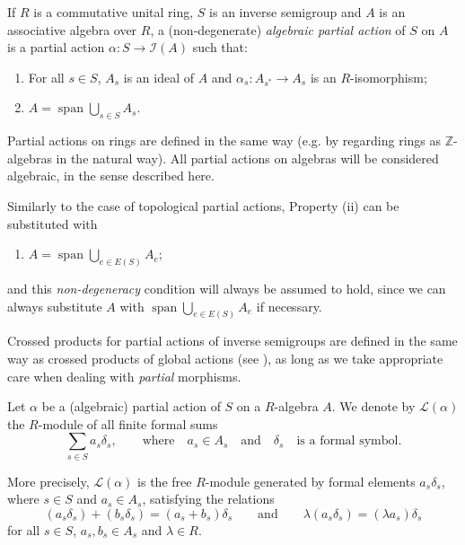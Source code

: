\begin{definition}[{\cite{MR2115083}}]\label{definitionalgebraicpartialaction}
If $R$ is a commutative unital ring, $S$ is an inverse semigroup and $A$ is an associative algebra over $R$, a (non-degenerate) \emph{algebraic partial action} of $S$ on $A$ is a partial action $\alpha:S\to\mathcal{I}(A)$ such that:
\begin{enumerate}
\item[(i)] For all $s\in S$, $A_s$ is an ideal of $A$ and $\alpha_s:A_{s^*}\to A_s$ is an $R$-isomorphism;
\item[(ii)] $A=\operatorname{span}\bigcup_{s\in S}A_s$.
\end{enumerate}
Partial actions on rings are defined in the same way (e.g. by regarding rings as $\mathbb{Z}$-algebras in the natural way). All partial actions on algebras will be considered algebraic, in the sense described here.
\end{definition}

Similarly to the case of topological partial actions, Property (ii) can be substituted with
\begin{enumerate}
\item[(ii)'] $A=\operatorname{span}\bigcup_{e\in E(S)}A_e$;
\end{enumerate}
and this \emph{non-degeneracy} condition will always be assumed to hold, since we can always substitute $A$ with $\operatorname{span}\bigcup_{e\in E(S)}A_e$ if necessary.

Crossed products for partial actions of inverse semigroups are defined in the same way as crossed products of global actions (see \cite{MR2559043}), as long as we take appropriate care when dealing with \emph{partial} morphisms.

\begin{definition}\label{definitionLalpha}
Let $\alpha$ be a (algebraic) partial action of $S$ on a $R$-algebra $A$. We denote by $\mathscr{L}(\alpha)$ the $R$-module of all finite formal sums
\[\sum_{s\in S} a_s \delta_s,\qquad\text{where}\quad a_s\in A_s\quad\text{and}\quad\delta_s\quad\text{is a formal symbol}.\]

More precisely, $\mathscr{L}(\alpha)$ is the free $R$-module generated by formal elements $a_s\delta_s$, where $s\in S$ and $a_s\in A_s$, satisfying the relations
\[(a_s\delta_s)+(b_s\delta_s)=(a_s+b_s)\delta_s\qquad\text{and}\qquad \lambda(a_s\delta_s)=(\lambda a_s)\delta_s\]
for all $s\in S$, $a_s,b_s\in A_s$ and $\lambda\in R$.
\end{definition}

